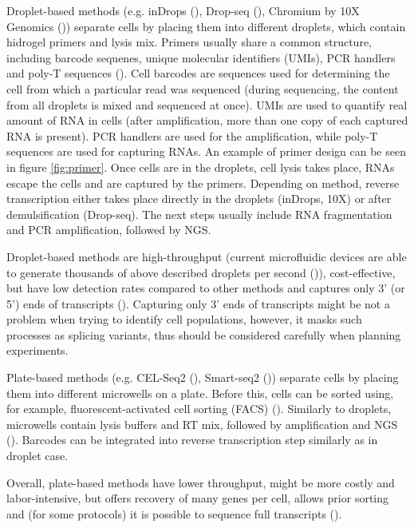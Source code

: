 Droplet-based methods (e.g. inDrops (\cite{Klein2015}), Drop-seq (\cite{Macosko2015}),
Chromium by 10X Genomics (\cite{Zheng2017}))
separate cells by placing them into different droplets, which contain hidrogel primers and lysis mix.
Primers usually share a common structure, including barcode sequenes, unique molecular identifiers (UMIs),
PCR handlers and poly-T sequences (\cite{Zhang2019}).
Cell barcodes are sequences used for determining the cell from which a particular read was sequenced
(during sequencing, the content from all droplets is mixed and sequenced at once).
UMIs are used to quantify real amount of RNA in cells
(after amplification, more than one copy of each captured RNA is present).
PCR handlers are used for the amplification, while poly-T sequences are used for capturing RNAs.
An example of primer design can be seen in figure \ref{fig:primer}.
Once cells are in the droplets, cell lysis takes place, RNAs escape the cells and are captured by the primers.
Depending on method,
reverse transcription either takes place directly in the droplets (inDrops, 10X) or after demulsification (Drop-seq).
The next steps usually include RNA fragmentation and PCR amplification, followed by NGS.

Droplet-based methods are high-throughput
(current microfluidic devices are able to generate thousands of above described droplets per second (\cite{Prakadan2017})),
cost-effective, but have low detection rates compared to other methods and
captures only 3' (or 5') ends of transcripts (\cite{Heumos2023}).
Capturing only 3' ends of transcripts might be not a problem when trying to identify cell populations,
however, it masks such processes as splicing variants, thus should be considered carefully when planning experiments.

Plate-based methods (e.g. CEL-Seq2 (\cite{Hashimshony2016}), Smart-seq2 (\cite{Picelli2013}))
separate cells by placing them into different microwells on a plate.
Before this, cells can be sorted using, for example, fluorescent-activated cell sorting (FACS) (\cite{Heumos2023}).
Similarly to droplets, microwells contain lysis buffers and RT mix,
followed by amplification and NGS (\cite{Hashimshony2016}).
Barcodes can be integrated into reverse transcription step similarly as in droplet case.

Overall, plate-based methods have lower throughput, might be more costly and labor-intensive,
but offers recovery of many genes per cell, allows prior sorting and
(for some protocols) it is possible to sequence full transcripts (\cite{Heumos2023}).

